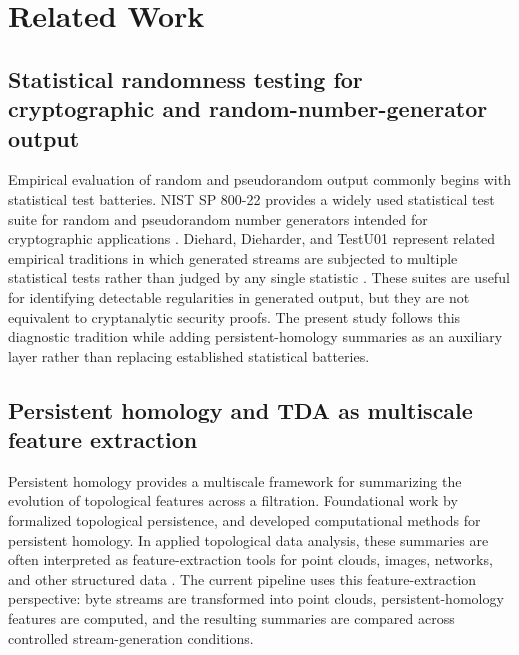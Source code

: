 
\section{Related Work}
\label{sec:related-work}

\subsection{Statistical randomness testing for cryptographic and random-number-generator output}
\label{subsec:related-randomness-testing}

Empirical evaluation of random and pseudorandom output commonly begins with statistical test batteries. NIST SP 800-22 provides a widely used statistical test suite for random and pseudorandom number generators intended for cryptographic applications \citep{nist2010sp80022}. Diehard, Dieharder, and TestU01 represent related empirical traditions in which generated streams are subjected to multiple statistical tests rather than judged by any single statistic \citep{marsaglia1995diehard,brown2018dieharder,lecuyer2007testu01}. These suites are useful for identifying detectable regularities in generated output, but they are not equivalent to cryptanalytic security proofs. The present study follows this diagnostic tradition while adding persistent-homology summaries as an auxiliary layer rather than replacing established statistical batteries.

\subsection{Persistent homology and TDA as multiscale feature extraction}
\label{subsec:related-persistent-homology}

Persistent homology provides a multiscale framework for summarizing the evolution of topological features across a filtration. Foundational work by \citet{edelsbrunner2002topological} formalized topological persistence, and \citet{zomorodian2005computing} developed computational methods for persistent homology. In applied topological data analysis, these summaries are often interpreted as feature-extraction tools for point clouds, images, networks, and other structured data \citep{carlsson2009topology}. The current pipeline uses this feature-extraction perspective: byte streams are transformed into point clouds, persistent-homology features are computed, and the resulting summaries are compared across controlled stream-generation conditions.

